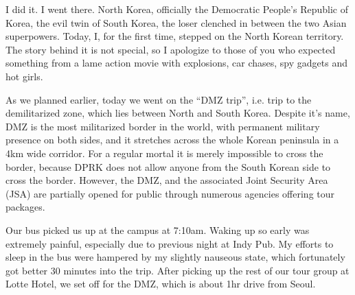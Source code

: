 \begin{post}
	\begin{content}
I did it. I went there. North Korea, officially the Democratic People's Republic of Korea, the evil twin of South Korea, the loser clenched in between the two Asian superpowers. Today, I, for the first time, stepped on the North Korean territory. The story behind it is not special, so I apologize to those of you who expected something from a lame action movie with explosions, car chases, spy gadgets and hot girls.

\begin{figure}
\vspace{-12pt}
\centering{}
\end{figure}As we planned earlier, today we went on the ``DMZ trip'', i.e. trip to the demilitarized zone, which lies between North and South Korea. Despite it's name, DMZ is the most militarized border in the world, with permanent military presence on both sides, and it stretches across the whole Korean peninsula in a 4km wide corridor. For a regular mortal it is merely impossible to cross the border, because DPRK does not allow anyone from the South Korean side to cross the border. However, the DMZ, and the associated Joint Security Area (JSA) are partially opened for public through numerous agencies offering tour packages.

Our bus picked us up at the campus at 7:10am. Waking up so early was extremely painful, especially due to previous night at Indy Pub. My efforts to sleep in the bus were hampered by my slightly nauseous state, which fortunately got better 30 minutes into the trip. After picking up the rest of our tour group at Lotte Hotel, we set off for the DMZ, which is about 1hr drive from Seoul.


\end{content}
\end{post}
